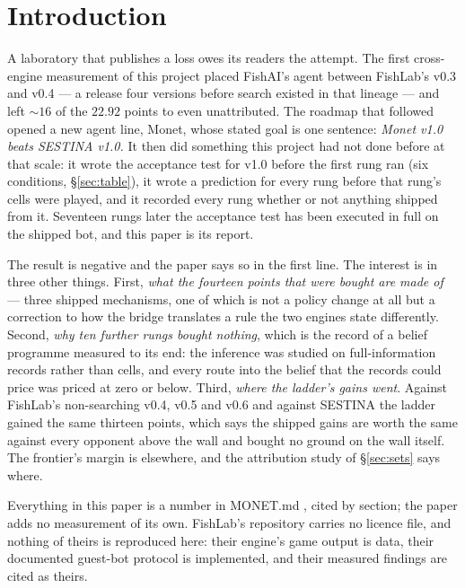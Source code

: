 \documentclass[11pt]{article}
\newcommand{\monet}{MONET.md}
\begin{document}
\section{Introduction}
\label{sec:intro}

A laboratory that publishes a loss owes its readers the attempt. The first cross-engine measurement
of this project \cite{frontier} placed FishAI's agent between FishLab's v0.3 and v0.4 --- a release
four versions before search existed in that lineage --- and left ${\sim}16$ of the $22.92$ points to
even unattributed. The roadmap that followed \cite{monet} opened a new agent line, Monet, whose
stated goal is one sentence: \emph{Monet v1.0 beats SESTINA v1.0.} It then did something this
project had not done before at that scale: it wrote the acceptance test for v1.0 before the first
rung ran (six conditions, \S\ref{sec:table}), it wrote a prediction for every rung before that
rung's cells were played, and it recorded every rung whether or not anything shipped from it.
Seventeen rungs later the acceptance test has been executed in full on the shipped bot, and this
paper is its report.

The result is negative and the paper says so in the first line. The interest is in three other
things. First, \emph{what the fourteen points that were bought are made of} --- three shipped
mechanisms, one of which is not a policy change at all but a correction to how the bridge
translates a rule the two engines state differently. Second, \emph{why ten further rungs
bought nothing}, which is the record of a belief programme measured to its end: the inference was
studied on full-information records rather than cells, and every route into the belief that the
records could price was priced at zero or below. Third, \emph{where the ladder's gains went}.
Against FishLab's non-searching v0.4, v0.5 and v0.6 and against SESTINA the ladder gained the same
thirteen points, which says the shipped gains are worth the same against every opponent above the
wall and bought no ground on the wall itself. The frontier's margin is elsewhere, and the
attribution study of \S\ref{sec:sets} says where.

Everything in this paper is a number in \monet{} \cite{monet}, cited by section; the paper adds no
measurement of its own. FishLab's repository carries no licence file, and nothing of theirs is
reproduced here: their engine's game output is data, their documented guest-bot protocol is
implemented, and their measured findings are cited as theirs.
\end{document}
